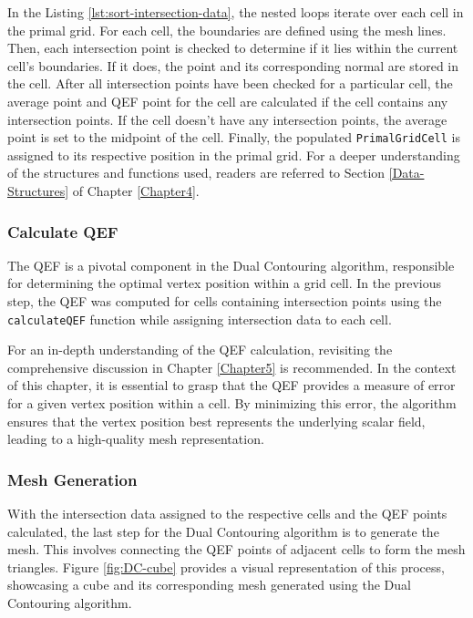 In the Listing \ref{lst:sort-intersection-data}, the nested loops iterate over each cell in the primal grid. For each cell, the boundaries are defined using the mesh lines. Then, each intersection point is checked to determine if it lies within the current cell's boundaries. If it does, the point and its corresponding normal are stored in the cell. After all intersection points have been checked for a particular cell, the average point and QEF point for the cell are calculated if the cell contains any intersection points. If the cell doesn't have any intersection points, the average point is set to the midpoint of the cell. Finally, the populated \texttt{PrimalGridCell} is assigned to its respective position in the primal grid. For a deeper understanding of the structures and functions used, readers are referred to Section \ref{Data-Structures} of Chapter \ref{Chapter4}.

\subsubsection{Calculate QEF}

The QEF is a pivotal component in the Dual Contouring algorithm, responsible for determining the optimal vertex position within a grid cell. In the previous step, the QEF was computed for cells containing intersection points using the \texttt{calculateQEF} function while assigning intersection data to each cell.

For an in-depth understanding of the QEF calculation, revisiting the comprehensive discussion in Chapter \ref{Chapter5} is recommended. In the context of this chapter, it is essential to grasp that the QEF provides a measure of error for a given vertex position within a cell. By minimizing this error, the algorithm ensures that the vertex position best represents the underlying scalar field, leading to a high-quality mesh representation.

\subsubsection{Mesh Generation}

With the intersection data assigned to the respective cells and the QEF points calculated, the last step for the Dual Contouring algorithm is to generate the mesh. This involves connecting the QEF points of adjacent cells to form the mesh triangles. Figure \ref{fig:DC-cube} provides a visual representation of this process, showcasing a cube and its corresponding mesh generated using the Dual Contouring algorithm.


